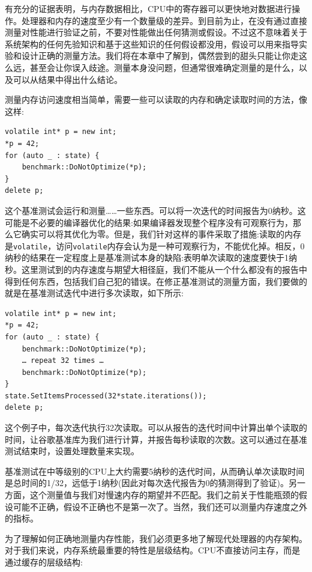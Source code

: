 
有充分的证据表明，与内存数据相比，CPU中的寄存器可以更快地对数据进行操作。处理器和内存的速度至少有一个数量级的差异。到目前为止，在没有通过直接测量对性能进行验证之前，不要对性能做出任何猜测或假设。不过这不意味着关于系统架构的任何先验知识和基于这些知识的任何假设都没用，假设可以用来指导实验和设计正确的测量方法。我们将在本章中了解到，偶然尝到的甜头只能让你走这么远，甚至会让你误入歧途。测量本身没问题，但通常很难确定测量的是什么，以及可以从结果中得出什么结论。

测量内存访问速度相当简单，需要一些可以读取的内存和确定读取时间的方法，像这样:

\begin{lstlisting}[style=styleCXX]
volatile int* p = new int;
*p = 42;
for (auto _ : state) {
	benchmark::DoNotOptimize(*p);
}
delete p;
\end{lstlisting}

这个基准测试会运行和测量……一些东西。可以将一次迭代的时间报告为0纳秒。这可能是不必要的编译器优化的结果:如果编译器发现整个程序没有可观察行为，那么它确实可以将其优化为零。但是，我们针对这样的事件采取了措施:读取的内存是\texttt{volatile}，访问\texttt{volatile}内存会认为是一种可观察行为，不能优化掉。相反，0纳秒的结果在一定程度上是基准测试本身的缺陷:表明单次读取的速度要快于1纳秒。这里测试到的内存速度与期望大相径庭，我们不能从一个什么都没有的报告中得到任何东西，包括我们自己犯的错误。在修正基准测试的测量方面，我们要做的就是在基准测试迭代中进行多次读取，如下所示:

\begin{lstlisting}[style=styleCXX]
volatile int* p = new int;
*p = 42;
for (auto _ : state) {
	benchmark::DoNotOptimize(*p);
	… repeat 32 times …
	benchmark::DoNotOptimize(*p);
}
state.SetItemsProcessed(32*state.iterations());
delete p;
\end{lstlisting}

这个例子中，每次迭代执行32次读取。可以从报告的迭代时间中计算出单个读取的时间，让谷歌基准库为我们进行计算，并报告每秒读取的次数。这可以通过在基准测试结束时，设置处理数量来实现。

基准测试在中等级别的CPU上大约需要5纳秒的迭代时间，从而确认单次读取时间是总时间的1/32，远低于1纳秒(因此对每次迭代报告为0的猜测得到了验证)。另一方面，这个测量值与我们对慢速内存的期望并不匹配。我们之前关于性能瓶颈的假设可能不正确，假设不正确也不是第一次了。当然，我们还可以测量内存速度之外的指标。


为了理解如何正确地测量内存性能，我们必须更多地了解现代处理器的内存架构。对于我们来说，内存系统最重要的特性是层级结构。CPU不直接访问主存，而是通过缓存的层级结构:

